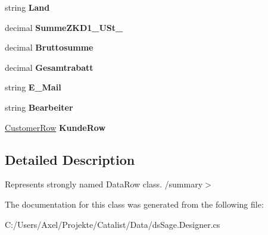 \begin{DoxyCompactItemize}
\item 
string {\bfseries Land}\hypertarget{class_products_1_1_data_1_1ds_sage_1_1_order_row_a8087a6b4596cfd7af15d35fae351d295}{}\label{class_products_1_1_data_1_1ds_sage_1_1_order_row_a8087a6b4596cfd7af15d35fae351d295}

\item 
decimal {\bfseries Summe\+Z\+K\+D1\+\_\+\+U\+St\+\_}\hypertarget{class_products_1_1_data_1_1ds_sage_1_1_order_row_a6af512859e269891bdd0881920993721}{}\label{class_products_1_1_data_1_1ds_sage_1_1_order_row_a6af512859e269891bdd0881920993721}

\item 
decimal {\bfseries Bruttosumme}\hypertarget{class_products_1_1_data_1_1ds_sage_1_1_order_row_a55d4057dd626b31ea18c1f83c6c9bf5a}{}\label{class_products_1_1_data_1_1ds_sage_1_1_order_row_a55d4057dd626b31ea18c1f83c6c9bf5a}

\item 
decimal {\bfseries Gesamtrabatt}\hypertarget{class_products_1_1_data_1_1ds_sage_1_1_order_row_ad76e9a84fdbaeae0b9aaaba9cc615087}{}\label{class_products_1_1_data_1_1ds_sage_1_1_order_row_ad76e9a84fdbaeae0b9aaaba9cc615087}

\item 
string {\bfseries E\+\_\+\+Mail}\hypertarget{class_products_1_1_data_1_1ds_sage_1_1_order_row_a18daf509685fc6499e75e5b3579952a6}{}\label{class_products_1_1_data_1_1ds_sage_1_1_order_row_a18daf509685fc6499e75e5b3579952a6}

\item 
string {\bfseries Bearbeiter}\hypertarget{class_products_1_1_data_1_1ds_sage_1_1_order_row_a40d9b8d5276dc60ae426596b436bcf35}{}\label{class_products_1_1_data_1_1ds_sage_1_1_order_row_a40d9b8d5276dc60ae426596b436bcf35}

\item 
\hyperlink{class_products_1_1_data_1_1ds_sage_1_1_customer_row}{Customer\+Row} {\bfseries Kunde\+Row}\hypertarget{class_products_1_1_data_1_1ds_sage_1_1_order_row_ab568ccf648b4cd04c5769323be63e530}{}\label{class_products_1_1_data_1_1ds_sage_1_1_order_row_ab568ccf648b4cd04c5769323be63e530}

\end{DoxyCompactItemize}


\subsection{Detailed Description}
Represents strongly named Data\+Row class. /summary$>$ 

The documentation for this class was generated from the following file\+:\begin{DoxyCompactItemize}
\item 
C\+:/\+Users/\+Axel/\+Projekte/\+Catalist/\+Data/ds\+Sage.\+Designer.\+cs\end{DoxyCompactItemize}
